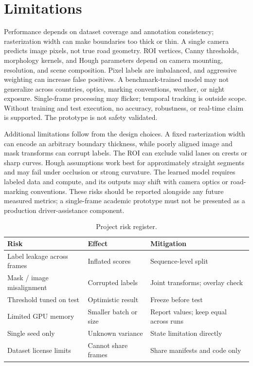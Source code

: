 \documentclass[10pt,a4paper,twocolumn]{article}
\begin{document}
\section{Limitations}\label{sec:limits}
Performance depends on dataset coverage and annotation consistency; rasterization width can make boundaries too thick or thin. A single camera predicts image pixels, not true road geometry. ROI vertices, Canny thresholds, morphology kernels, and Hough parameters depend on camera mounting, resolution, and scene composition. Pixel labels are imbalanced, and aggressive weighting can increase false positives. A benchmark-trained model may not generalize across countries, optics, marking conventions, weather, or night exposure. Single-frame processing may flicker; temporal tracking is outside scope. Without training and test execution, no accuracy, robustness, or real-time claim is supported. The prototype is not safety validated.

Additional limitations follow from the design choices. A fixed rasterization width can encode an arbitrary boundary thickness, while poorly aligned image and mask transforms can corrupt labels. The ROI can exclude valid lanes on crests or sharp curves. Hough assumptions work best for approximately straight segments and may fail under occlusion or strong curvature. The learned model requires labeled data and compute, and its outputs may shift with camera optics or road-marking conventions. These risks should be reported alongside any future measured metrics; a single-frame academic prototype must not be presented as a production driver-assistance component.

\begin{table}[H]
\centering
\caption{Project risk register.}
\footnotesize
\begin{tabularx}{\columnwidth}{|X|X|X|}
\hline
\rowcolor{gray!18}\textbf{Risk}&\textbf{Effect}&\textbf{Mitigation}\\ \hline
Label leakage across frames & Inflated scores & Sequence-level split\\ \hline
Mask / image misalignment & Corrupted labels & Joint transforms; overlay check\\ \hline
Threshold tuned on test & Optimistic result & Freeze before test\\ \hline
Limited GPU memory & Smaller batch or size & Report values; keep equal across runs\\ \hline
Single seed only & Unknown variance & State limitation directly\\ \hline
Dataset license limits & Cannot share frames & Share manifests and code only\\ \hline
\end{tabularx}
\end{table}
\end{document}

